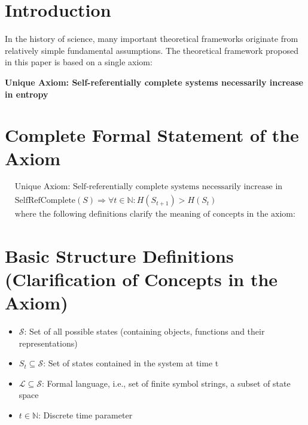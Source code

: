 \section{Introduction}
\label{sec:ch01_axiom_and_derivation:introduction}

In the history of science, many important theoretical frameworks originate from relatively simple fundamental assumptions. The theoretical framework proposed in this paper is based on a single axiom:

\textbf{Unique Axiom: Self-referentially complete systems necessarily increase in entropy}

\section{Complete Formal Statement of the Axiom}
\label{sec:ch01_axiom_and_derivation:complete-formal-statement-of-the-axiom}

\begin{tcolorbox}[colback=gray!10,colframe=black]
\begin{equation*}
\begin{aligned}
&\text{Unique Axiom: Self-referentially complete systems necessarily increase in entropy} \\
&\text{SelfRefComplete}(S) \Rightarrow \forall t \in \mathbb{N}: H(S_{t+1}) > H(S_t) \\
&\text{where the following definitions clarify the meaning of concepts in the axiom:}
\end{aligned}
\end{equation*}
\end{tcolorbox}

\section{Basic Structure Definitions (Clarification of Concepts in the Axiom)}
\label{sec:ch01_axiom_and_derivation:basic-structure-definitions-clarification-of-concepts-in-the-axiom}

\begin{itemize}
\item $\mathcal{S}$: Set of all possible states (containing objects, functions and their representations)
\item $S_t \subseteq \mathcal{S}$: Set of states contained in the system at time t
\item $\mathcal{L} \subseteq \mathcal{S}$: Formal language, i.e., set of finite symbol strings, a subset of state space
\item $t \in \mathbb{N}$: Discrete time parameter
\end{itemize}

